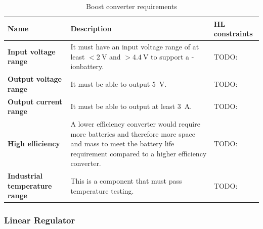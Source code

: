 \documentclass{report}
\newcommand{\liion}{\ce{Li}-ion}
\begin{document}
\begin{table}[H]
  \centering
  \begin{tabular}{|L{0.2\textwidth}|L{0.495\textwidth}|L{0.2\textwidth}|}
    \hline
    \textbf{Name}                         & \textbf{Description}                                                                                                                                                        & \textbf{HL constraints} \\ \hline
    \textbf{Input voltage range}          & It must have an input voltage range of at least $<\SI{2}{\volt}$ and $>\SI{4.4}{\volt}$ to support a \liion battery.                                                        & TODO:                   \\\hline
    \textbf{Output voltage range}         & It must be able to output \SI{5}{\volt}.                                                                                                                                    & TODO:                   \\\hline
    \textbf{Output current range}         & It must be able to output at least \SI{3}{\ampere}.                                                                                                                         & TODO:                   \\\hline
    \textbf{High efficiency}              & A lower efficiency converter would require more batteries and therefore more space and mass to meet the battery life requirement compared to a higher efficiency converter. & TODO:                   \\\hline
    \textbf{Industrial temperature range} & This is a component that must pass temperature testing.                                                                                                                     & TODO:                   \\\hline
  \end{tabular}
  \caption{Boost converter requirements}
  \label{tabl:boost-requirements}
\end{table}

\subsubsection{Linear Regulator}
\end{document}
